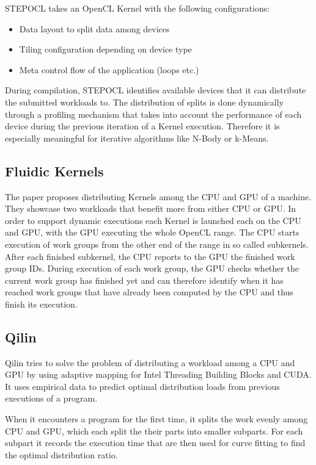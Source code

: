 STEPOCL takes an OpenCL Kernel with the following configurations:
\begin{itemize}
    \item Data layout to split data among devices
    \item Tiling configuration depending on device type
    \item Meta control flow of the application (loops etc.)
\end{itemize}

During compilation, STEPOCL identifies available devices that it can distribute the submitted workloads to. The distribution of splits is done dynamically through a profiling mechanism that takes into account the performance of each device during the previous iteration of a Kernel execution. Therefore it is especially meaningful for iterative algorithms like N-Body or k-Means.

\subsection*{Fluidic Kernels\cite{fluidic}}

The paper proposes distributing Kernels among the CPU and GPU of a machine. They showcase two workloads that benefit more from either CPU or GPU. In order to support dynamic executions each Kernel is launched each on the CPU and GPU, with the GPU executing the whole OpenCL range. The CPU starts execution of work groups from the other end of the range in so called subkernels. After each finished subkernel, the CPU reports to the GPU the finished work group IDs. During execution of each work group, the GPU checks whether the current work group has finished yet and can therefore identify when it has reached work groups that have already been computed by the CPU and thus finish its execution.

\subsection*{Qilin\cite{qilin}}

Qilin tries to solve the problem of distributing a workload among a CPU and GPU by using adaptive mapping for Intel Threading Building Blocks and CUDA. It uses empirical data to predict optimal distribution loads from previous executions of a program.

When it encounters a program for the first time, it splits the work evenly among CPU and GPU, which each split the their parts into smaller subparts. For each subpart it records the execution time that are then used for curve fitting to find the optimal distribution ratio.

